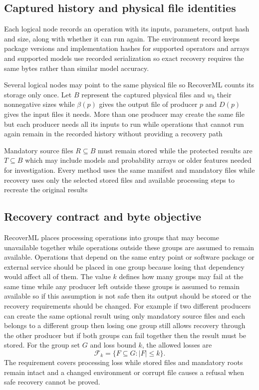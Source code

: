 \subsection{Captured history and physical file identities}

Each logical node records an operation with its inputs, parameters, output hash and size, along with whether it can run again. The environment record keeps package versions and implementation hashes for supported operators and arrays and supported models use recorded serialization so exact recovery requires the same bytes rather than similar model accuracy.

Several logical nodes may point to the same physical file so RecoverML counts its storage only once. Let $B$ represent the captured physical files and $w_b$ their nonnegative sizes while $\beta(p)$ gives the output file of producer $p$ and $D(p)$ gives the input files it needs. More than one producer may create the same file but each producer needs all its inputs to run while operations that cannot run again remain in the recorded history without providing a recovery path

Mandatory source files $R\subseteq B$ must remain stored while the protected results are $T\subseteq B$ which may include models and probability arrays or older features needed for investigation. Every method uses the same manifest and mandatory files while recovery uses only the selected stored files and available processing steps to recreate the original results

\subsection{Recovery contract and byte objective}

RecoverML places processing operations into groups that may become unavailable together while operations outside these groups are assumed to remain available. Operations that depend on the same entry point or software package or external service should be placed in one group because losing that dependency would affect all of them. The value $k$ defines how many groups may fail at the same time while any producer left outside these groups is assumed to remain available so if this assumption is not safe then its output should be stored or the recovery requirements should be changed. For example if two different producers can create the same optional result using only mandatory source files and each belongs to a different group then losing one group still allows recovery through the other producer but if both groups can fail together then the result must be stored. For the group set $G$ and loss bound $k$, the allowed losses are
\begin{equation}
  \mathcal{F}_k=\{F\subseteq G: |F|\leq k\}.
  \label{eq:faults}
\end{equation}
The requirement covers processing loss while stored files and mandatory roots remain intact and a changed environment or corrupt file causes a refusal when safe recovery cannot be proved.


